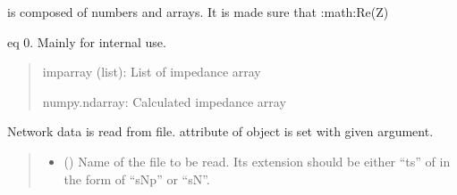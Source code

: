\documentclass[letterpaper,10pt,english]{sphinxmanual}
\begin{document}
\begin{fulllineitems}

\begin{fulllineitems}
\label{\detokenize{touchstone:touchstone.spfile.prepare_ref_impedance_array}}
\pysigstartsignatures
{}
\pysigstopsignatures\begin{description}
\sphinxAtStartPar
is composed of numbers and arrays. It is made sure that :math:{\color{red}\bfseries{}\textasciigrave{}}Re(Z)

\end{description}

\sphinxAtStartPar
eq 0\textasciigrave{}. Mainly for internal use.
\begin{quote}
\begin{description}
\sphinxAtStartPar
imparray (list): List of impedance array

\sphinxAtStartPar
numpy.ndarray: Calculated impedance array

\end{description}
\end{quote}

\end{fulllineitems}


\begin{fulllineitems}
\label{\detokenize{touchstone:touchstone.spfile.read_file}}
\pysigstartsignatures
{}
\pysigstopsignatures
\sphinxAtStartPar
Network data is read from file.  attribute of object is set with given argument.
\begin{quote}\begin{description}
\begin{itemize}
\item {} 
\sphinxAtStartPar
{} () \textendash{} Name of the file to be read. Its extension should be either “ts” of in the form of “sNp” or “sN”.


\end{itemize}
\end{description}
\end{quote}
\end{fulllineitems}
\end{fulllineitems}
\end{document}
